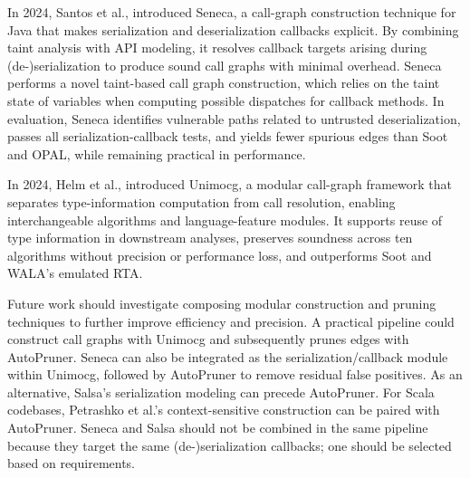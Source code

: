 In 2024, Santos et al., introduced Seneca, a call-graph construction technique for Java that makes serialization and deserialization callbacks explicit. By combining taint analysis with API modeling, it resolves callback targets arising during (de-)serialization to produce sound call graphs with minimal overhead. Seneca performs a novel taint-based call graph construction, which relies on the taint state of variables when computing possible dispatches for callback methods.  In evaluation, Seneca identifies vulnerable paths related to untrusted deserialization, passes all serialization-callback tests, and yields fewer spurious edges than Soot and OPAL, while remaining practical in performance.

In 2024, Helm et al., introduced Unimocg, a modular call-graph framework that separates type-information computation from call resolution, enabling interchangeable algorithms and language-feature modules. It supports reuse of type information in downstream analyses, preserves soundness across ten algorithms without precision or performance loss, and outperforms Soot and WALA's emulated RTA.



Future work should investigate composing modular construction and pruning techniques to further improve efficiency and precision. A practical pipeline could construct call graphs with Unimocg and subsequently prunes edges with AutoPruner. Seneca can also be integrated as the serialization/callback module within Unimocg, followed by AutoPruner to remove residual false positives. 
As an alternative, Salsa's serialization modeling can precede AutoPruner. For Scala codebases, Petrashko et al.'s context-sensitive construction can be paired with AutoPruner. Seneca and Salsa should not be combined in the same pipeline because they target the same (de-)serialization callbacks; one should be selected based on requirements.
